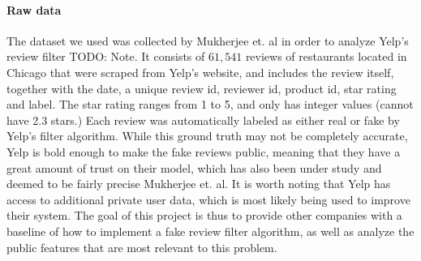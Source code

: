 \documentclass[man, floatsintext, 10pt]{apa6}
\begin{document}
\paragraph{Raw data} The dataset we used was collected by Mukherjee et. al in order to analyze Yelp's review filter TODO: Note. It consists of  $61,541$ reviews of restaurants located in Chicago that were scraped from Yelp's website, and includes the review itself, together with the date, a unique review id, reviewer id, product id, star rating and label. The star rating ranges from 1 to 5, and only has integer values (cannot have 2.3 stars.) Each review was automatically labeled as either real or fake by Yelp's filter algorithm. While this ground truth may not be completely accurate, Yelp is bold enough to make the fake reviews public, meaning that they have a great amount of trust on their model, which has also been under study and deemed to be fairly precise Mukherjee et. al. It is worth noting that Yelp has access to additional private user data, which is most likely being used to improve their system. The goal of this project is thus to provide other companies with a baseline of how to implement a fake review filter algorithm, as well as analyze the public features that are most relevant to this problem.

\vspace{2mm}
\end{document}
